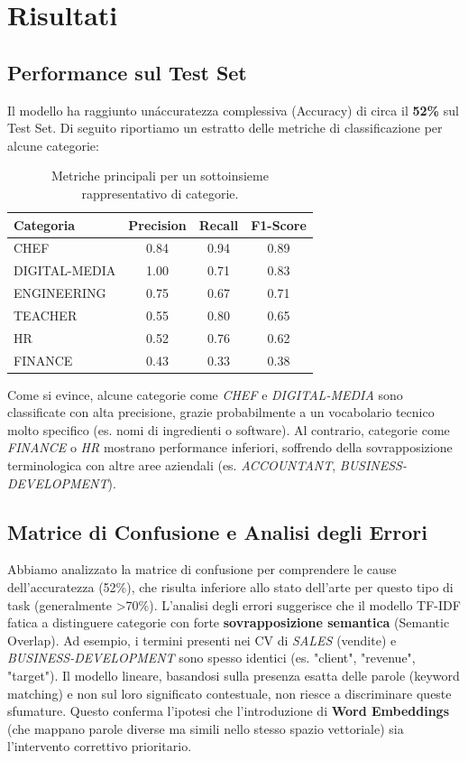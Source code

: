 \documentclass[a4paper,12pt]{article}
\begin{document}
\section{Risultati}

\subsection{Performance sul Test Set}
Il modello ha raggiunto un\'accuratezza complessiva (Accuracy) di circa il \textbf{52\%} sul Test Set.
Di seguito riportiamo un estratto delle metriche di classificazione per alcune categorie:

\begin{table}[H]
\centering
\begin{tabular}{lccc}
\toprule
\textbf{Categoria} & \textbf{Precision} & \textbf{Recall} & \textbf{F1-Score} \\
\midrule
CHEF & 0.84 & 0.94 & 0.89 \\
DIGITAL-MEDIA & 1.00 & 0.71 & 0.83 \\
ENGINEERING & 0.75 & 0.67 & 0.71 \\
TEACHER & 0.55 & 0.80 & 0.65 \\
HR & 0.52 & 0.76 & 0.62 \\
FINANCE & 0.43 & 0.33 & 0.38 \\
\bottomrule
\end{tabular}
\caption{Metriche principali per un sottoinsieme rappresentativo di categorie.}
\end{table}

Come si evince, alcune categorie come \textit{CHEF} e \textit{DIGITAL-MEDIA} sono classificate con alta precisione, grazie probabilmente a un vocabolario tecnico molto specifico (es. nomi di ingredienti o software). Al contrario, categorie come \textit{FINANCE} o \textit{HR} mostrano performance inferiori, soffrendo della sovrapposizione terminologica con altre aree aziendali (es. \textit{ACCOUNTANT}, \textit{BUSINESS-DEVELOPMENT}).

\subsection{Matrice di Confusione e Analisi degli Errori}
Abbiamo analizzato la matrice di confusione per comprendere le cause dell'accuratezza (52\%), che risulta inferiore allo stato dell'arte per questo tipo di task (generalmente >70\%).
L'analisi degli errori suggerisce che il modello TF-IDF fatica a distinguere categorie con forte \textbf{sovrapposizione semantica} (Semantic Overlap). Ad esempio, i termini presenti nei CV di \textit{SALES} (vendite) e \textit{BUSINESS-DEVELOPMENT} sono spesso identici (es. "client", "revenue", "target").
Il modello lineare, basandosi sulla presenza esatta delle parole (keyword matching) e non sul loro significato contestuale, non riesce a discriminare queste sfumature. Questo conferma l'ipotesi che l'introduzione di \textbf{Word Embeddings} (che mappano parole diverse ma simili nello stesso spazio vettoriale) sia l'intervento correttivo prioritario.
\end{document}
